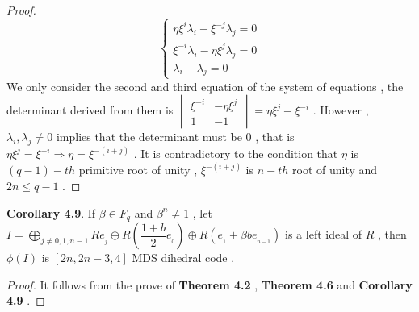 \documentclass{article}
\begin{document}
\begin{proof}
\begin{equation}
\begin{cases}
    \eta\xi^{\scriptscriptstyle i}\lambda_i-\xi^{\scriptscriptstyle -j}\lambda_j=0\\
    \xi^{\scriptscriptstyle -i}\lambda_i-\eta\xi^{\scriptscriptstyle j}\lambda_j=0\\
    \lambda_i-\lambda_j=0
\end{cases}
\end{equation}
We only consider the second and third equation of the system of equations , the determinant derived from them is 
$\begin{vmatrix}
    \xi^{\scriptscriptstyle -i}&-\eta\xi^{\scriptscriptstyle j}\\
    1&-1
\end{vmatrix}=\eta\xi^{\scriptscriptstyle j}-\xi^{\scriptscriptstyle -i}$ . However , $\lambda_i,\lambda_j\neq0$ implies that the determinant must be $0$ , that is $\eta\xi^{\scriptscriptstyle j}=\xi^{\scriptscriptstyle -i}\Rightarrow\eta=\xi^{\scriptscriptstyle -(i+j)}$ . It is contradictory to the condition that $\eta$ is $(q-1)-th$ primitive root of unity , $\xi^{\scriptscriptstyle -(i+j)}$ is $n-th$ root of unity and $2n\leq q-1$ .
\end{proof}
\textbf{Corollary 4.9}. If $\beta\in{F_q}$ and $\beta^{\scriptscriptstyle n}\neq1$ , let $I=\mathop{\bigoplus}\limits_{j\neq 0,1,n-1}Re_{_j}\oplus R(\dfrac{1+b}{2}e_{_0})\oplus R(e_{_1}+\beta be_{_{n-1}})$ is a left ideal of $R$ , then $\phi(I)$ is $[2n,2n-3,4]$ MDS dihedral code .
\begin{proof}
    It follows from the prove of \textbf{Theorem 4.2} , \textbf{Theorem 4.6} and \textbf{Corollary 4.9} .
\end{proof}
\end{document}
